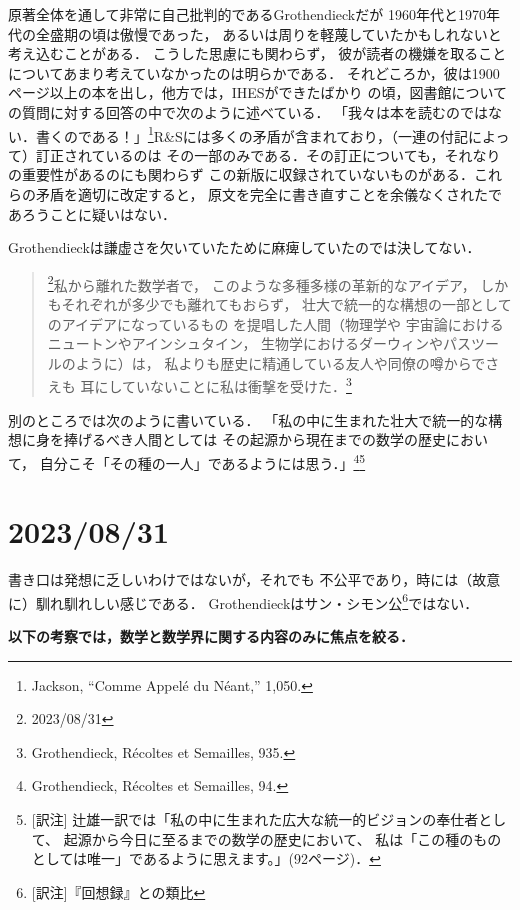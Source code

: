 \documentclass[11pt, a4paper, dvipdfmx]{jlreq}
\theoremstyle{definition}
\theoremstyle{mystyle}
\numberwithin{equation}{section} %
\begin{document}
原著全体を通して非常に自己批判的であるGrothendieckだが
1960年代と1970年代の全盛期の頃は傲慢であった，
あるいは周りを軽蔑していたかもしれないと考え込むことがある．
こうした思慮にも関わらず，
彼が読者の機嫌を取ることについてあまり考えていなかったのは明らかである．
それどころか，彼は1900ページ以上の本を出し，他方では，IHESができたばかり
の頃，図書館についての質問に対する回答の中で次のように述べている．
「我々は本を読むのではない．書くのである！」\footnote[18]{
    Jackson, ``Comme Appel\'e du N\'eant,'' 1,050.
}R\&Sには多くの矛盾が含まれており，（一連の付記によって）訂正されているのは
その一部のみである．その訂正についても，それなりの重要性があるのにも関わらず
この新版に収録されていないものがある．これらの矛盾を適切に改定すると，
原文を完全に書き直すことを余儀なくされたであろうことに疑いはない．

Grothendieckは謙虚さを欠いていたために麻痺していたのでは決してない．
\begin{quotation}
    \footnote{2023/08/31}私から離れた数学者で，
    このような多種多様の革新的なアイデア，
    しかもそれぞれが多少でも離れてもおらず，
    壮大で統一的な構想の一部としてのアイデアになっているもの
    を提唱した人間（物理学や
    宇宙論におけるニュートンやアインシュタイン，
    生物学におけるダーウィンやパスツールのように）は，
    私よりも歴史に精通している友人や同僚の噂からでさえも
    耳にしていないことに私は衝撃を受けた．\footnote[19]{
        Grothendieck, R\'ecoltes et Semailles, 935.
    }
\end{quotation}

別のところでは次のように書いている．
「私の中に生まれた壮大で統一的な構想に身を捧げるべき人間としては
その起源から現在までの数学の歴史において，
自分こそ「その種の一人」であるようには思う．」\footnote[20]{
    Grothendieck, R\'ecoltes et Semailles, 94.
}\footnote{
    [訳注]
    辻雄一訳では「私の中に生まれた広大な統一的ビジョンの奉仕者として、
    起源から今日に至るまでの数学の歴史において、
    私は「この種のものとしては唯一」であるように思えます。」(92ページ)．
}

\section*{2023/08/31}

書き口は発想に乏しいわけではないが，それでも
不公平であり，時には（故意に）馴れ馴れしい感じである．
Grothendieckはサン・シモン公\footnote{
    [訳注]『回想録』との類比
}ではない．

\bigskip\begin{center}
    \textbf{以下の考察では，数学と数学界に関する内容のみに焦点を絞る．}
\end{center}\bigskip
\end{document}
